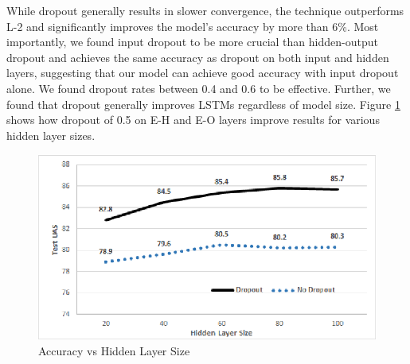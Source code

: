 While dropout generally results in slower convergence, the technique outperforms L-2 and significantly improves the model's accuracy by more than 6\%. Most importantly, we found input dropout to be more crucial than hidden-output dropout and achieves the same accuracy as dropout on both input and hidden layers, suggesting that our model can achieve good accuracy with input dropout alone. %
We found dropout rates between 0.4 and 0.6 to be effective.
Further, we found that dropout generally improves LSTMs regardless of model size. Figure \ref{fig:dropout_hidden} shows how dropout of 0.5 on E-H and E-O layers improve results for various hidden layer sizes. 

\begin{figure}[t]
\centering
  \centering
  \includegraphics[width=.9\columnwidth]{images/dropout_hidden.eps}
  \caption{Accuracy vs Hidden Layer Size}
\label{fig:dropout_hidden}
\end{figure}
